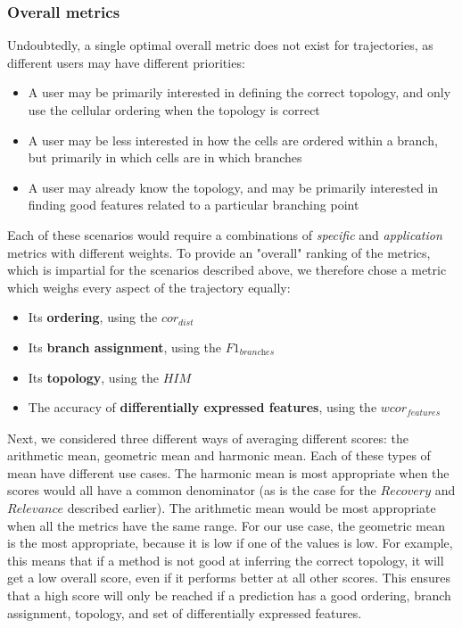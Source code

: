 \subsubsection{Overall metrics}

Undoubtedly, a single optimal overall metric does not exist for trajectories, as different users may have different priorities:

\begin{itemize}
	\item A user may be primarily interested in defining the correct topology, and only use the cellular ordering when the topology is correct
	\item A user may be less interested in how the cells are ordered within a branch, but primarily in which cells are in which branches
	\item A user may already know the topology, and may be primarily interested in finding good features related to a particular branching point
\end{itemize}

Each of these scenarios would require a combinations of \textit{specific} and \textit{application} metrics with different weights. To provide an "overall" ranking of the metrics, which is impartial for the scenarios described above, we therefore chose a metric which weighs every aspect of the trajectory equally:

\begin{itemize}
	\item Its \textbf{ordering}, using the $\textit{cor}_{\textit{dist}}$
	\item Its \textbf{branch assignment}, using the $\textit{F1}_{\textit{branches}}$
	\item Its \textbf{topology}, using the $\textit{HIM}$
	\item The accuracy of \textbf{differentially expressed features}, using the $\textit{wcor}_{\textit{features}}$
\end{itemize}

Next, we considered three different ways of averaging different scores: the arithmetic mean, geometric mean and harmonic mean. Each of these types of mean have different use cases. The harmonic mean is most appropriate when the scores would all have a common denominator (as is the case for the $\textit{Recovery}$ and $\textit{Relevance}$ described earlier). The arithmetic mean would be most appropriate when all the metrics have the same range. For our use case, the geometric mean is the most appropriate, because it is low if one of the values is low. For example, this means that if a method is not good at inferring the correct topology, it will get a low overall score, even if it performs better at all other scores. This ensures that a high score will only be reached if a prediction has a good ordering, branch assignment, topology, and set of differentially expressed features.

